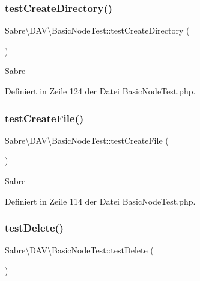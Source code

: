 \subsubsection{\texorpdfstring{test\+Create\+Directory()}{testCreateDirectory()}}
{\footnotesize\ttfamily Sabre\textbackslash{}\+D\+A\+V\textbackslash{}\+Basic\+Node\+Test\+::test\+Create\+Directory (\begin{DoxyParamCaption}{ }\end{DoxyParamCaption})}

Sabre 

Definiert in Zeile 124 der Datei Basic\+Node\+Test.\+php.

\mbox{\label{class_sabre_1_1_d_a_v_1_1_basic_node_test_abd598a3d1c918aec62bdca4a9aa086e1}} 
\subsubsection{\texorpdfstring{test\+Create\+File()}{testCreateFile()}}
{\footnotesize\ttfamily Sabre\textbackslash{}\+D\+A\+V\textbackslash{}\+Basic\+Node\+Test\+::test\+Create\+File (\begin{DoxyParamCaption}{ }\end{DoxyParamCaption})}

Sabre 

Definiert in Zeile 114 der Datei Basic\+Node\+Test.\+php.

\mbox{\label{class_sabre_1_1_d_a_v_1_1_basic_node_test_aea11114064e206ed94eaa3c999d3b14a}} 
\subsubsection{\texorpdfstring{test\+Delete()}{testDelete()}}
{\footnotesize\ttfamily Sabre\textbackslash{}\+D\+A\+V\textbackslash{}\+Basic\+Node\+Test\+::test\+Delete (\begin{DoxyParamCaption}{ }\end{DoxyParamCaption})}

